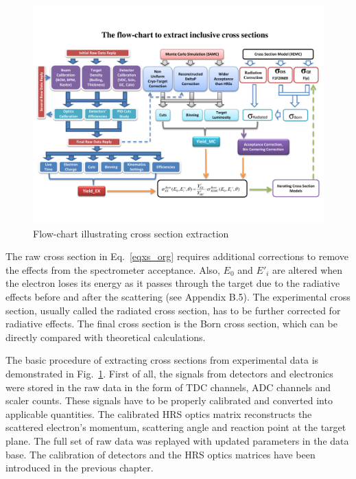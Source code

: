 \documentclass[a4paper,10.5pt]{article}
\begin{document}
\begin{figure}[!ht]
 \begin{center}
  \includegraphics[angle=90, type=pdf, ext=.pdf,read=.pdf,width=1.\textwidth]{./figures/E08014_XS_FlowChart}
  \caption[Flow-chart illustrating cross section extraction]{Flow-chart illustrating cross section extraction}
  \label{xs_flow_chart}
 \end{center}
\end{figure}
The raw cross section in Eq.~\eqref{eqxs_org} requires additional corrections to remove the effects from the spectrometer acceptance. Also, $E_{0}$ and $E'_{i}$ are altered when the electron loses its energy as it passes through the target due to the radiative effects before and after the scattering (see Appendix B.5). The experimental cross section, usually called the radiated cross section, has to be further corrected for radiative effects. The final cross section is the Born cross section, which can be directly compared with theoretical calculations. 

 The basic procedure of extracting cross sections from experimental data is demonstrated in Fig.~\ref{xs_flow_chart}. First of all, the signals from detectors and electronics were stored in the raw data in the form of TDC channels, ADC channels and scaler counts. These signals have to be properly calibrated and converted into applicable quantities. The calibrated HRS optics matrix reconstructs the scattered electron's momentum, scattering angle and reaction point at the target plane. The full set of raw data was replayed with updated parameters in the data base. The calibration of detectors and the HRS optics matrices have been introduced in the previous chapter. 
 
\end{document}
